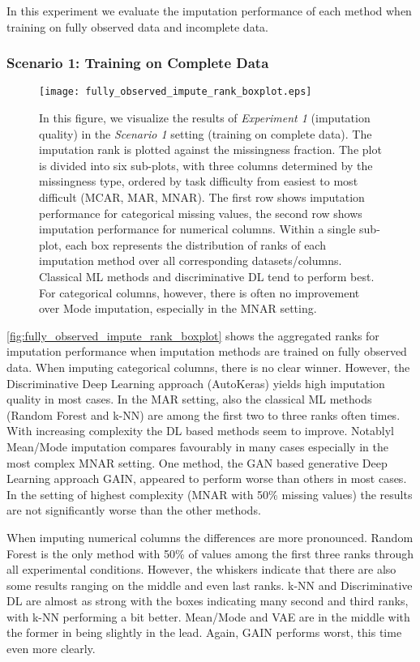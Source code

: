 In this experiment we evaluate the imputation performance of each method when training on fully observed data and incomplete data.

\subsubsection{Scenario 1: Training on Complete Data}

\begin{figure}\centering
    \texttt{[image: fully\_observed\_impute\_rank\_boxplot.eps]}
    \caption[Imputation Ranks - Fully Observed]{In this figure, we visualize the results of \textit{Experiment 1} (imputation quality) in the \textit{Scenario 1} setting (training on complete data). The imputation rank is plotted against the missingness fraction. The plot is divided into six sub-plots, with three columns determined by the missingness type, ordered by task difficulty from easiest to most difficult (MCAR, MAR, MNAR). The first row shows imputation performance for categorical missing values,  the second row shows imputation performance for numerical columns. Within a single sub-plot, each box represents the distribution of ranks of each imputation method over all corresponding datasets/columns. Classical ML methods and discriminative DL tend to perform best. For categorical columns, however, there is often no improvement over Mode imputation, especially in the MNAR setting.
	}
	\label{fig:fully_observed_impute_rank_boxplot}
\end{figure}

\autoref{fig:fully_observed_impute_rank_boxplot} shows the aggregated ranks for imputation performance when imputation methods are trained on fully observed data.
When imputing categorical columns, there is no clear winner. However, the Discriminative Deep Learning approach (AutoKeras) yields high imputation quality in most cases. In the MAR setting, also the classical ML methods (Random Forest and k-NN) are among the first two to three ranks often times. With increasing complexity the DL based methods seem to improve. Notablyl Mean/Mode imputation compares favourably in many cases especially in the most complex MNAR setting. One method, the GAN based generative Deep Learning approach GAIN, appeared to perform worse than others in most cases. In the setting of highest complexity (MNAR with 50\% missing values) the results are not significantly worse than the other methods.

When imputing numerical columns the differences are more pronounced. Random Forest is the only method with 50\% of values among the first three ranks through all experimental conditions. However, the whiskers indicate that there are also some results ranging on the middle and even last ranks. k-NN and Discriminative DL are almost as strong with the boxes indicating many second and third ranks, with k-NN performing a bit better. Mean/Mode and VAE are in the middle with the former in being slightly in the lead. Again, GAIN performs worst, this time even more clearly.

